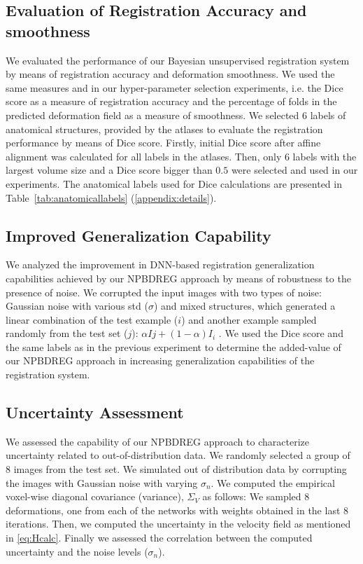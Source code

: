 \documentclass[preprint,authoryear]{elsarticle}
\begin{document}
\subsection{Evaluation of Registration Accuracy and smoothness}
We evaluated the performance of our Bayesian unsupervised registration system by means of registration accuracy and deformation smoothness. We used the same measures and in our hyper-parameter selection experiments, i.e. the Dice score as a measure of registration accuracy and the percentage of folds in the predicted deformation field as a measure of smoothness. 
We selected 6 labels of anatomical structures, provided by the atlases to evaluate the registration performance by means of Dice score. Firstly, initial Dice score after affine alignment was calculated for all labels in the atlases. Then, only $6$ labels with the largest volume size and a Dice score bigger than $0.5$ were selected and used in our experiments. The anatomical labels used for Dice calculations are presented in Table~\ref{tab:anatomicallabels} (\ref{appendix:details}).

\subsection{Improved Generalization Capability}
We analyzed the improvement in DNN-based registration generalization capabilities achieved by our NPBDREG approach by means of robustness to the presence of noise. We corrupted the input images with two types of noise: Gaussian noise with various std ($\sigma$) and mixed structures, which generated a linear combination of the test example ($i$) and another example sampled randomly from the test set ($j$): $\alpha I{j}+(1-\alpha)I_{i}$ \cite{freiman2019unsupervised}. 
We used the Dice score and the same labels as in the previous experiment to determine the added-value of our NPBDREG approach in increasing generalization capabilities of the registration system. 

\subsection{Uncertainty Assessment} \label{sebsec:uncasses}
 We assessed the capability of our NPBDREG approach to characterize uncertainty related to out-of-distribution data. We randomly selected  a group of $8$ images from the test set. We simulated out of distribution data by corrupting the images with Gaussian noise with varying $\sigma_n$. 
We computed the empirical voxel-wise diagonal covariance (variance), $\Sigma_V$ as follows: We sampled $8$ deformations, one from each of the networks with weights obtained in the last $8$ iterations. Then, we computed the uncertainty in the velocity field as mentioned in \eqref{eq:Hcalc}.
Finally we assessed the correlation between the computed uncertainty and the noise levels ($\sigma_n$).
\end{document}
